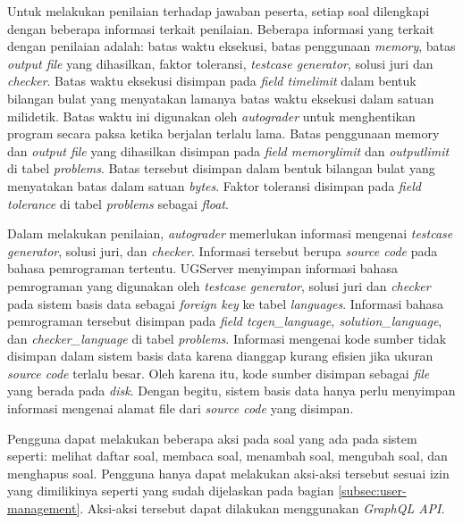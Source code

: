 \par Untuk melakukan penilaian terhadap jawaban peserta, setiap soal dilengkapi dengan beberapa informasi terkait penilaian. Beberapa informasi yang terkait dengan penilaian adalah: batas waktu eksekusi, batas penggunaan \textit{memory}, batas \textit{output file} yang dihasilkan, faktor toleransi, \textit{testcase generator}, solusi juri dan \textit{checker}. Batas waktu eksekusi disimpan pada \textit{field timelimit} dalam bentuk bilangan bulat yang menyatakan lamanya batas waktu eksekusi dalam satuan milidetik. Batas waktu ini digunakan oleh \textit{autograder} untuk menghentikan program secara paksa ketika berjalan terlalu lama. Batas penggunaan memory dan \textit{output file} yang dihasilkan disimpan pada \textit{field memorylimit} dan \textit{outputlimit} di tabel \textit{problems}. Batas tersebut disimpan dalam bentuk bilangan bulat yang menyatakan batas dalam satuan \textit{bytes}. Faktor toleransi disimpan pada \textit{field tolerance} di tabel \textit{problems} sebagai \textit{float}.

\par Dalam melakukan penilaian, \textit{autograder} memerlukan informasi mengenai \textit{testcase generator}, solusi juri, dan \textit{checker}. Informasi tersebut berupa \textit{source code} pada bahasa pemrograman tertentu. UGServer menyimpan informasi bahasa pemrograman yang digunakan oleh \textit{testcase generator}, solusi juri dan \textit{checker} pada sistem basis data sebagai \textit{foreign key} ke tabel \textit{languages}. Informasi bahasa pemrograman tersebut disimpan pada \textit{field tcgen\_language, solution\_language}, dan \textit{checker\_language} di tabel \textit{problems}. Informasi mengenai kode sumber tidak disimpan dalam sistem basis data karena dianggap kurang efisien jika ukuran \textit{source code} terlalu besar. Oleh karena itu, kode sumber disimpan sebagai \textit{file} yang berada pada \textit{disk}. Dengan begitu, sistem basis data hanya perlu menyimpan informasi mengenai alamat file dari \textit{source code} yang disimpan.


\par Pengguna dapat melakukan beberapa aksi pada soal yang ada pada sistem seperti: melihat daftar soal, membaca soal, menambah soal, mengubah soal, dan menghapus soal. Pengguna hanya dapat melakukan aksi-aksi tersebut sesuai izin yang dimilikinya seperti yang sudah dijelaskan pada bagian \ref{subsec:user-management}. Aksi-aksi tersebut dapat dilakukan menggunakan \textit{GraphQL API}.

